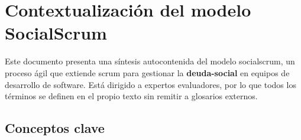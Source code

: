 \chapter{Contextualización del modelo SocialScrum}
\label{anexo:contextualizacion}

Este documento presenta una síntesis autocontenida del modelo \gls{socialscrum}, un proceso ágil que extiende \gls{scrum} para gestionar la \textbf{\gls{deuda-social}} en equipos de desarrollo de software. Está dirigido a expertos evaluadores, por lo que todos los términos se definen en el propio texto sin remitir a glosarios externos.

\section{Conceptos clave}

